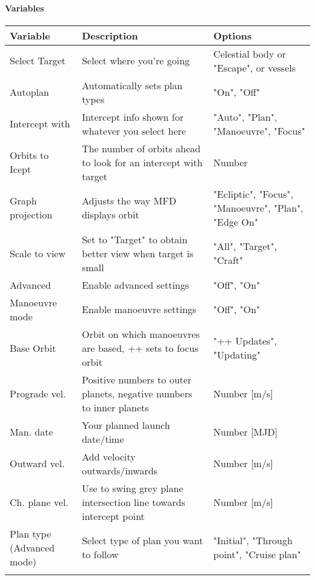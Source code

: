 \documentclass[Orbiter User Manual.tex]{subfiles}
\begin{document}
\paragraph{Variables}
	\begin{longtable}{ |p{}|p{}|p{}| }
	\hline\rule{0pt}{2ex}
	\textbf{Variable} & \textbf{Description} & \textbf{Options}\\
	\hline\rule{0pt}{2ex}
	Select Target & Select where you're going & Celestial body or "Escape", or vessels\\
	\hline\rule{0pt}{2ex}
	Autoplan & Automatically sets plan types & "On", "Off"\\
	\hline\rule{0pt}{2ex}
	Intercept with & Intercept info shown for whatever you select here & "Auto", "Plan", "Manoeuvre", "Focus"\\
	\hline\rule{0pt}{2ex}
	Orbits to Icept & The number of orbits ahead to look for an intercept with target & Number\\
	\hline\rule{0pt}{2ex}
	Graph projection & Adjusts the way MFD displays orbit & "Ecliptic", "Focus", "Manoeuvre", "Plan", "Edge On"\\
	\hline\rule{0pt}{2ex}
	Scale to view & Set to "Target" to obtain better view when target is small & "All", "Target", "Craft"\\
	\hline\rule{0pt}{2ex}
	Advanced & Enable advanced settings & "Off", "On"\\
	\hline\rule{0pt}{2ex}
	Manoeuvre mode & Enable manoeuvre settings & "Off", "On"\\
	\hline\rule{0pt}{2ex}
	Base Orbit & Orbit on which manoeuvres are based, ++ sets to focus orbit & "++ Updates", "Updating"\\
	\hline\rule{0pt}{2ex}
	Prograde vel. & Positive numbers to outer planets, negative numbers to inner planets & Number [m/s]\\
	\hline\rule{0pt}{2ex}
	Man. date & Your planned launch date/time & Number [MJD]\\
	\hline\rule{0pt}{2ex}
	Outward vel. & Add velocity outwards/inwards & Number [m/s]\\
	\hline\rule{0pt}{2ex}
	Ch. plane vel. & Use to swing grey plane intersection line towards intercept point & Number [m/s]\\
	\hline\rule{0pt}{2ex}
	Plan type (Advanced mode) & Select type of plan you want to follow & "Initial", "Through point", "Cruise plan"\\
	\hline\rule{0pt}{2ex}

\end{longtable}
\end{document}
